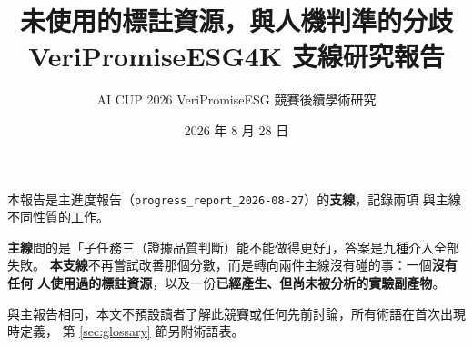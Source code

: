 \documentclass[11pt,a4paper]{ctexart}
\title{\textbf{未使用的標註資源，與人機判準的分歧}\\[0.4em]
       \large VeriPromiseESG4K 支線研究報告}
\author{AI CUP 2026 VeriPromiseESG 競賽後續學術研究}
\date{2026 年 8 月 28 日}
\begin{document}

\maketitle

\begin{tcolorbox}[colback=gray!8, colframe=gray!50, title=這份文件的定位]
本報告是主進度報告（\texttt{progress\_report\_2026-08-27}）的\textbf{支線}，記錄兩項
與主線不同性質的工作。

\medskip
\textbf{主線}問的是「子任務三（證據品質判斷）能不能做得更好」，答案是九種介入全部失敗。
\textbf{本支線}不再嘗試改善那個分數，而是轉向兩件主線沒有碰的事：一個\textbf{沒有任何
人使用過的標註資源}，以及一份\textbf{已經產生、但尚未被分析的實驗副產物}。

\medskip
與主報告相同，本文不預設讀者了解此競賽或任何先前討論，所有術語在首次出現時定義，
第 \ref{sec:glossary} 節另附術語表。
\end{tcolorbox}
\end{document}
